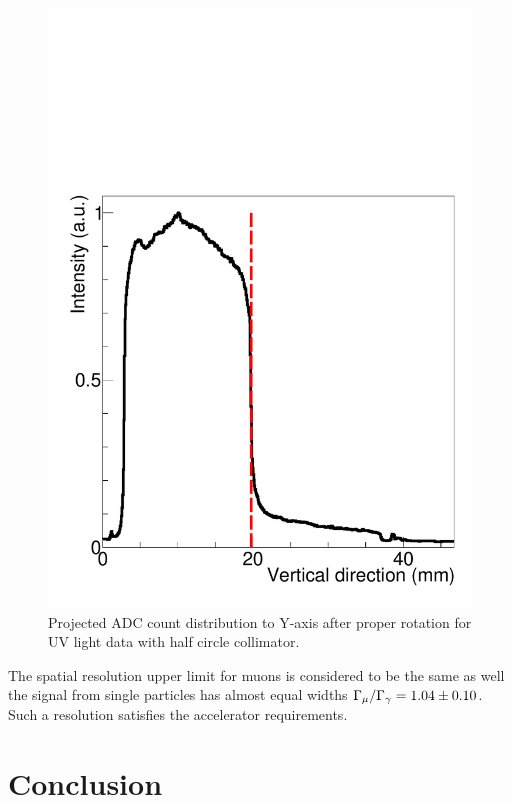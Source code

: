 \documentclass[preprint,3p,twocolumn]{elsarticle}
\begin{document}
\begin{figure}[tbp]
    \centering
	\includegraphics[width=\columnwidth]{figure/edge_image_w_uv_4_BH_axis.pdf}
	\caption{Projected ADC count distribution to Y-axis after
          proper rotation for UV light data with half circle
          collimator.}
	\label{fig:half_circle}
\end{figure}

The spatial resolution upper limit for muons is considered to be
the same as well the signal from single particles has almost
equal widths
$\Gamma_{\mu} / \Gamma_{\gamma} = \num{1.04 \pm 0.10}$.  Such a
resolution satisfies the accelerator requirements.

\section{Conclusion}
\end{document}
